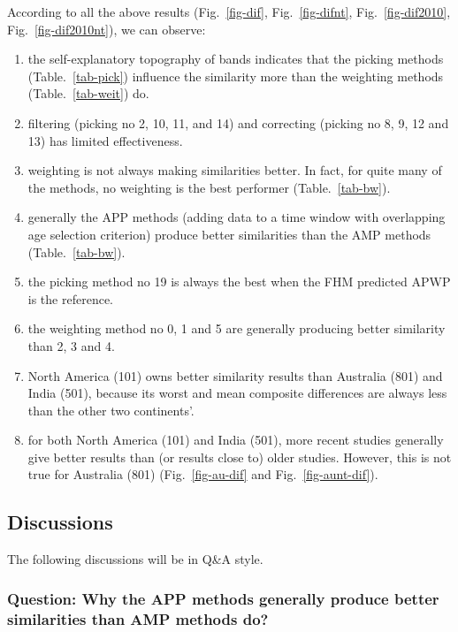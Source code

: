 According to all the above results (Fig.~\ref{fig-dif}, Fig.~\ref{fig-difnt},
Fig.~\ref{fig-dif2010}, Fig.~\ref{fig-dif2010nt}), we can observe:
%
\begin{enumerate}
  \item the self-explanatory topography of bands indicates that the picking
        methods (Table.~\ref{tab-pick}) influence the similarity more than the
        weighting methods (Table.~\ref{tab-weit}) do.
  \item filtering (picking no 2, 10, 11, and 14) and
        correcting (picking no 8, 9, 12 and 13) has limited effectiveness.
  \item weighting is not always making similarities better. In fact, for quite
        many of the methods, no weighting is the best performer
		(Table.~\ref{tab-bw}).
  \item generally the APP methods (adding data to a time window with overlapping
        age selection criterion) produce better similarities than the AMP
        methods (Table.~\ref{tab-bw}).
  \item the picking method no 19 is always the best when the FHM predicted APWP
		is the reference.
  \item the weighting method no 0, 1 and 5 are generally producing better
        similarity than 2, 3 and 4.
  \item North America (101) owns better similarity results than Australia (801)
        and India (501), because its worst and mean composite differences are
		always less than the other two continents'.
  \item for both North America (101) and India (501), more recent studies
        generally give better results than (or results close to) older studies.
		However, this is not true for Australia (801) (Fig.~\ref{fig-au-dif} and
		Fig.~\ref{fig-aunt-dif}).
\end{enumerate}

\subsection{Discussions}

The following discussions will be in Q\&A style.

\subsubsection{Question: Why the APP methods generally produce better
similarities than AMP methods do?}

